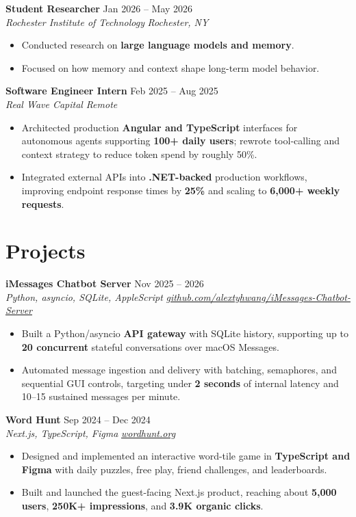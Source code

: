 \documentclass[10pt,letterpaper]{article}
\newif\ifresumeFirstRole
\newcommand{\resumeRole}[4]{%
  \ifresumeFirstRole
    \global\resumeFirstRolefalse
  \else
    \vspace{0pt plus 1fill}%
  \fi
  \textbf{#1} \hfill #2\\
  \textit{#3} \hfill \textit{#4}
}
\begin{document}
\resumeRole{Student Researcher}{Jan 2026 -- May 2026}{Rochester Institute of Technology}{Rochester, NY}
\begin{itemize}
  \item Conducted research on \textbf{large language models and memory}.
  \item Focused on how memory and context shape long-term model behavior.
\end{itemize}

\resumeRole{Software Engineer Intern}{Feb 2025 -- Aug 2025}{Real Wave Capital}{Remote}
\begin{itemize}
  \item Architected production \textbf{Angular and TypeScript} interfaces for autonomous agents supporting \textbf{100+ daily users}; rewrote tool-calling and context strategy to reduce token spend by roughly 50\%.
  \item Integrated external APIs into \textbf{.NET-backed} production workflows, improving endpoint response times by \textbf{25\%} and scaling to \textbf{6,000+ weekly requests}.
\end{itemize}

\section*{Projects}
\resumeRole{iMessages Chatbot Server}{Nov 2025 -- 2026}{Python, asyncio, SQLite, AppleScript}{\href{https://github.com/alextyhwang/iMessages-Chatbot-Server}{github.com/alextyhwang/iMessages-Chatbot-Server}}
\begin{itemize}
  \item Built a Python/asyncio \textbf{API gateway} with SQLite history, supporting up to \textbf{20 concurrent} stateful conversations over macOS Messages.
  \item Automated message ingestion and delivery with batching, semaphores, and sequential GUI controls, targeting under \textbf{2 seconds} of internal latency and 10--15 sustained messages per minute.
\end{itemize}

\resumeRole{Word Hunt}{Sep 2024 -- Dec 2024}{Next.js, TypeScript, Figma}{\href{https://wordhunt.org}{wordhunt.org}}
\begin{itemize}
  \item Designed and implemented an interactive word-tile game in \textbf{TypeScript and Figma} with daily puzzles, free play, friend challenges, and leaderboards.
  \item Built and launched the guest-facing Next.js product, reaching about \textbf{5,000 users}, \textbf{250K+ impressions}, and \textbf{3.9K organic clicks}.
\end{itemize}
\end{document}
